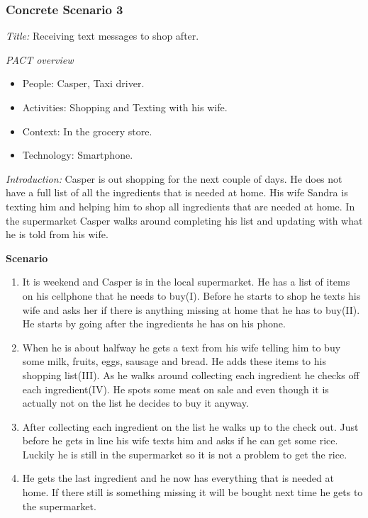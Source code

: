 \subsubsection{Concrete Scenario 3} \label{ConcreteScenario3}

\emph{Title:} Receiving text messages to shop after.

\emph{PACT overview}
\begin{itemize}
\item People: Casper, Taxi driver.  
\item Activities: Shopping and Texting with his wife.
\item Context: In the grocery store.
\item Technology: Smartphone.
\end{itemize}

\emph{Introduction:} Casper is out shopping for the next couple of days. He does not have a full list of all the ingredients that is needed at home. His wife Sandra is texting him and helping him to shop all ingredients that are needed at home. In the supermarket Casper walks around completing his list and updating with what he is told from his wife.  

\textbf{Scenario}
\begin{enumerate}
\item It is weekend and Casper is in the local supermarket. He has a list of items on his cellphone that he needs to buy(I). Before he starts to shop he texts his wife and asks her if there is anything missing at home that he has to buy(II). He starts by going after the ingredients he has on his phone.   
\item  When he is about halfway he gets a text from his wife telling him to buy some milk, fruits, eggs, sausage and bread. He adds these items to his shopping list(III). As he walks around collecting each ingredient he checks off each ingredient(IV). He spots some meat on sale and even though it is actually not on the list he decides to buy it anyway.  
\item After collecting each ingredient on the list he walks up to the check out. Just before he gets in line his wife texts him and asks if he can get some rice. Luckily he is still in the supermarket so it is not a problem to get the rice.  
\item He gets the last ingredient and he now has everything that is needed at home. If there still is something missing it will be bought next time he gets to the supermarket.
\end{enumerate}

